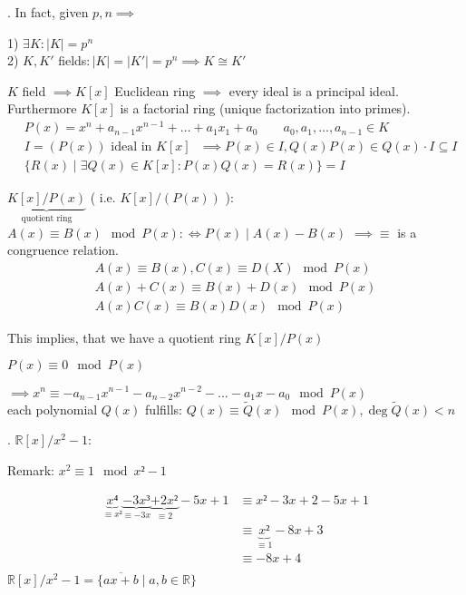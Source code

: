 \Remark.
In fact, given $p,n \implies $

1) $\exists K: |K| = p^n$\\
2) $K, K'$ fields$: |K| = |K'| = p^n \implies K \cong K'$

$K$ field $\implies K[x]$ Euclidean ring $\implies$ every ideal is a principal ideal. Furthermore $K[x]$ is a factorial ring (unique factorization into primes).
\begin{align*}
  & P(x)= x^n + a_{n-1} x^{n-1} + \ldots + a_1 x_1 + a_0 \qquad a_0, a_1, \ldots ,a_{n-1} \in K \\
  & I = (P(x)) \text{ ideal in $K[x]$ } \implies P(x) \in I, Q(x)P(x) \in Q(x) \cdot I \subseteq I \\
  & \{R(x) \mid \exists Q(x) \in K[x] : P(x)Q(x) = R(x)\} = I
\end{align*}

$\underbrace{K[x]/ P(x)}_{\text{quotient ring}}$ ( i.e. $K[x] / (P(x))$ ): $A(x) \equiv B(x) \mod P(x) :\Leftrightarrow P(x) ∣ A(x) - B(x)$ $\implies \equiv $ is a congruence relation.
\begin{align*}
  A(x) \equiv B(x), C(x) \equiv D(X) \mod P(x) \\
  A(x) + C(x) \equiv B(x) + D(x) \mod P(x) \\
  A(x)C(x) \equiv B(x) D(x) \mod P(x)
\end{align*}

This implies, that we have a quotient ring $K[x]/ P(x)$

$P(x) \equiv 0 \mod P(x)$

$\implies x^n \equiv -a_{n-1}x^{n-1} - a_{n-2}x^{n-2} - \ldots - a_1 x - a_0 \mod P(x)$\\
each polynomial $Q(x)$ fulfills:
$Q(x) \equiv \tilde{Q}(x) \mod P(x), \deg \tilde{Q}(x)<n$

\Example.
$\mathbb{R}[x] / x^2-1$:
\begin{leftbar}
  Remark: $x^2 \equiv 1 \mod {x² -1}$
\end{leftbar}\vspace{-1cm}
\begin{align*}
  \underbrace{x⁴}_{\equiv x²}
  \underbrace{-3x³}_{\equiv -3x}
  \underbrace{+2x²}_{\equiv 2}
  -5x + 1                       & \equiv x² - 3x +2 - 5x + 1\\
                                & \equiv \underbrace{x²}_{\equiv 1} - 8x + 3\\
                                & \equiv -8x + 4\\
\end{align*}
$\mathbb{R}[x] / x^2 -1 = \{ \overline{ax+b} \mid a,b \in \mathbb{R} \}$

